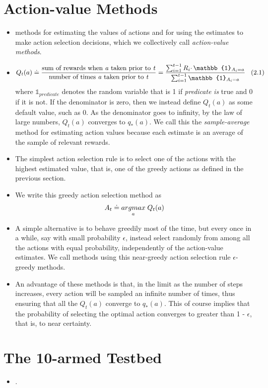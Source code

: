 \documentclass{article}
\begin{document}
\section{Action-value Methods}
\begin{itemize}
    \item methods for estimating the values of actions and for using the estimates to make action selection decisions, which we collectively call \emph{action-value methods}.
    \item $$ Q_t(a) \doteq \frac{\text{sum of rewards when \emph{a} taken prior to \emph{t}}}{\text{number of times \emph{a} taken prior to \emph{t}}} = \frac{\sum_{i=1}^{t-1} R_i \cdotp \mathbb{1}_{A_i=a}}{\sum_{i=1}^{t-1}\mathbb{1}_{A_i=a}} \thickspace \thickspace \thickspace \text{(2.1)} $$
    where $ \mathbb{1}_{predicate} $ denotes the random variable that is 1 if \emph{predicate is} true and 0 if it is not.
    If the denominator is zero, then we instead define $ Q_t(a) $ as some default value, such as
    0. As the denominator goes to infinity, by the law of large numbers, $ Q_t(a) $ converges to
    $ q_*(a) $. We call this the \emph{sample-average} method for estimating action values because each
    estimate is an average of the sample of relevant rewards.
    \item The simplest action selection rule is to select one of the actions with the highest
    estimated value, that is, one of the greedy actions as defined in the previous section.
    \item We write this greedy action selection method as
    $$ A_t \doteq \underset{a}{argmax} \thickspace Q_t(a) $$
    \item A simple alternative is to behave greedily most of the time, but every once in a while, 
    say with small probability $ \epsilon $, instead select randomly from among all the actions with equal 
    probability, independently of the action-value estimates. We call methods using this near-greedy action selection rule
    $ \epsilon $-greedy methods.
    \item An advantage of these methods is that, in the limit as the number of
    steps increases, every action will be sampled an infinite number of times, thus ensuring
    that all the $ Q_t(a) $ converge to $ q_*(a) $. This of course implies that the probability of selecting
    the optimal action converges to greater than 1 - $ \epsilon $, that is, to near certainty.
\end{itemize}

\section{The 10-armed Testbed}
\begin{itemize}
    \item .
\end{itemize}
\end{document}
